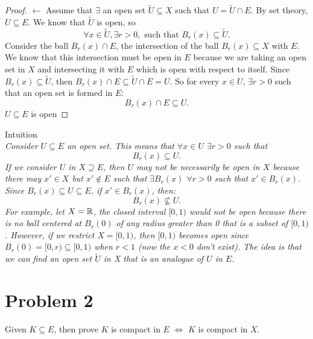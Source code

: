 \documentclass[a4paper]{article}
\begin{document}
\begin{proof}
$\leftarrow$ Assume that  $\exists $ an open set $\tilde{U} \subseteq X$ such that $U = \tilde{U} \cap E$. 
By set theory, $U \subseteq E$. We know that $\tilde{U}$ is open, so 
\[
  \forall x \in \tilde{U}, \exists r > 0, \text{ such that } B_r(x) \subseteq \tilde{U} 
.\] 
Consider the ball  $B_r(x) \cap E$, the intersection of the ball  $B_r(x) \subseteq X$ with $E$. We know that 
this intersection must be open in $E$ because we are taking an open set in $X$ and intersecting it with
$E$ which is open with respect to itself. Since $B_r(x) \subseteq \tilde{U}$, then 
$B_r(x) \cap E \subseteq \tilde{U} \cap E = U$.  So for every $x \in U$, $\exists  r > 0$
such that an open set is formed in $E$:
 \[
   B_r(x) \cap E \subseteq U
.\] 
$U \subseteq E$ is open
\end{proof}

\begin{note}{Intuition}\\
\textit{Consider $U \subseteq E$ an open set. This means that $\forall x \in U$  $\exists r > 0$ such that 
\[
B_r(x) \subseteq U
.\] 
If we consider $U$ in  $X \supseteq E$, then  $U$ may not be necessarily be open in  $X$ because there may
 $x' \in X$ but  $x' \not\in E$ such that $\exists B_r(x)$ $\forall r > 0$ such that $x' \in B_r(x)$. Since $B_r(x) \subseteq U \subseteq E$,
 if $x' \in B_r(x)$, then:
 \[
  B_r(x) \not\subseteq U
 .\] 
 For example, let $X = \mathbb{R}$, the closed interval $[0,1)$ would not be open because there is no ball centered at
 $B_r(0)$ of any radius greater than 0 that is a subset of $[0,1)$. However, if we restrict $X = [0,1)$, then
$[0,1)$ becomes open since $B_r(0)=[0,r) \subseteq [0,1)$ when  $r < 1$ (now the  $x < 0$ don't exist). 
The idea is that we can find an open set $\tilde{U}$ in X that is an analogue of  $U$ in  $E$.}
\end{note}

\section{Problem 2}
Given $K \subseteq E$, then prove $K$ is compact in $E$ $\iff$ $K$ is compact in $X$. 
\end{document}
